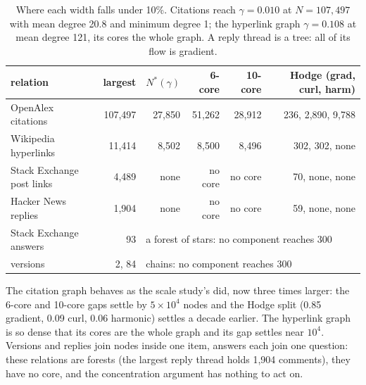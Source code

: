 \documentclass[11pt]{article}
\theoremstyle{plain}
\theoremstyle{definition}
\theoremstyle{remark}
\begin{document}
\begin{table}[ht]
\centering\footnotesize
\begin{tabular}{lrrrrr}
\toprule
relation & largest & $N^\ast(\gamma)$ & 6-core & 10-core & Hodge (grad, curl, harm)\\
\midrule
OpenAlex citations & 107,497 & 27,850 & 51,262 & 28,912 & 236, 2,890, 9,788\\
Wikipedia hyperlinks & 11,414 & 8,502 & 8,500 & 8,496 & 302, 302, none\\
Stack Exchange post links & 4,489 & none & no core & no core & 70, none, none\\
Hacker News replies & 1,904 & none & no core & no core & 59, none, none\\
Stack Exchange answers & 93 & \multicolumn{4}{l}{a forest of stars: no component reaches 300}\\
versions & 2, 84 & \multicolumn{4}{l}{chains: no component reaches 300}\\
\bottomrule
\end{tabular}
\caption{Where each width falls under 10\%. Citations reach $\gamma = 0.010$ at $N = 107{,}497$ with
mean degree 20.8 and minimum degree 1; the hyperlink graph $\gamma = 0.108$ at mean degree 121, its
cores the whole graph. A reply thread is a tree: all of its flow is gradient.}
\label{tab:macro}
\end{table}
The citation graph behaves as the scale study's did, now three times larger: the 6-core and 10-core
gaps settle by $5\times10^4$ nodes and the Hodge split (0.85 gradient, 0.09 curl, 0.06 harmonic)
settles a decade earlier. The hyperlink graph is so dense that its cores are the whole graph and its
gap settles near $10^4$. Versions and replies join nodes inside one item, answers each join one
question: these relations are forests (the largest reply thread holds 1,904 comments), they have no
core, and the concentration argument has nothing to act on.
\end{document}
